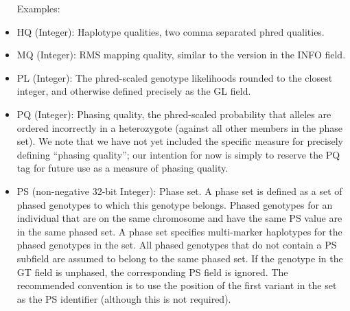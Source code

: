 \documentclass[8pt]{article}
\begin{document}
\begin{itemize}
  Examples:

  \item HQ (Integer): Haplotype qualities, two comma separated phred qualities.
  \item MQ (Integer): RMS mapping quality, similar to the version in the INFO field.
  \item PL (Integer): The phred-scaled genotype likelihoods rounded to the closest integer, and otherwise defined precisely as the GL field.
  \item PQ (Integer): Phasing quality, the phred-scaled probability that alleles are ordered incorrectly in a heterozygote (against all other members in the phase set).  We note that we have not yet included the specific measure for precisely defining ``phasing quality''; our intention for now is simply to reserve the PQ tag for future use as a measure of phasing quality.
  \item PS (non-negative 32-bit Integer): Phase set.  A phase set is defined as a set of phased genotypes to which this genotype belongs.  Phased genotypes for an individual that are on the same chromosome and have the same PS value are in the same phased set.  A phase set specifies multi-marker haplotypes for the phased genotypes in the set.  All phased genotypes that do not contain a PS subfield are assumed to belong to the same phased set.  If the genotype in the GT field is unphased, the corresponding PS field is ignored.  The recommended convention is to use the position of the first variant in the set as the PS identifier (although this is not required).
\end{itemize}
\end{document}

